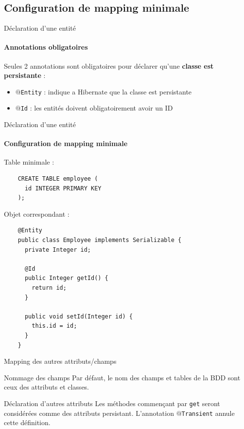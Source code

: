 \documentclass[compress]{beamer}%
\begin{document}
\subsection{Configuration de mapping minimale}
\begin{frame}{Déclaration d'une entité}
	\framesubtitle{Annotations obligatoires}
	
	Seules 2 annotations sont obligatoires pour déclarer qu'une \textbf{classe est persistante} :
	\pause
	\begin{itemize}[<+->]
		\item \texttt{$@$Entity} : indique a Hibernate que la classe est persistante
		\item \texttt{$@$Id} : les entités doivent obligatoirement avoir un ID
	\end{itemize}
	
\end{frame}

\begin{frame}[fragile]{Déclaration d'une entité}
	\framesubtitle{Configuration de mapping minimale}
	
	Table minimale : 
	\begin{lstlisting}
	CREATE TABLE employee (
	  id INTEGER PRIMARY KEY
	);
	\end{lstlisting}
	
	\pause
	Objet correspondant :
	\begin{lstlisting}
	@Entity
	public class Employee implements Serializable {
	  private Integer id;
	  
	  @Id
	  public Integer getId() {
	    return id;
	  }
	  
	  public void setId(Integer id) {
	    this.id = id;
	  }
	}
	\end{lstlisting}
	
	
\end{frame}

\begin{frame}{Mapping des autres attributs/champs}

	\begin{block}{Nommage des champs}
		Par défaut, le nom des champs et tables de la BDD sont ceux des attributs et classes.
	\end{block}

	\pause
	\begin{block}{Déclaration d'autres attributs}
		Les méthodes commençant par \texttt{get} seront considérées comme des attributs persistant. L'annotation \texttt{$@$Transient} annule cette définition.
	\end{block}
	
\end{frame}
\end{document}

